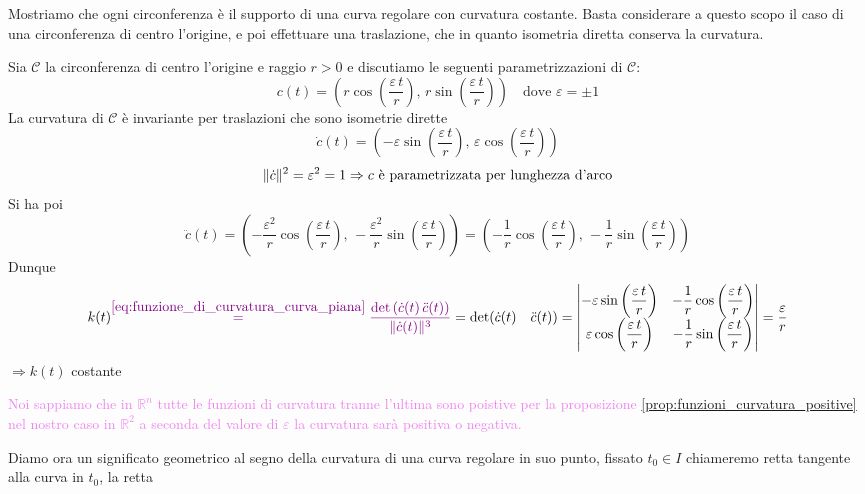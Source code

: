         \begin{esempio}
        Mostriamo che ogni circonferenza è il supporto di una curva regolare con curvatura costante.
        Basta considerare a questo scopo il caso di una circonferenza di centro l'origine, e poi effettuare una traslazione, che in quanto isometria diretta
        conserva la curvatura.

        Sia $\mathcal{C}$ la circonferenza di centro l'origine e raggio $r>0$ e discutiamo le seguenti parametrizzazioni di $\mathcal{C}$:
        \[ c(t) = \left(r \cos \left(\frac{\varepsilon \, t}{r}\right), \, r \sin \left(\frac{\varepsilon \, t}{r}\right) \right) \quad \text{dove }\varepsilon = \pm 1  \]
        La curvatura di $\mathcal{C}$ è invariante per traslazioni che sono isometrie dirette
        \[ \dot{c}(t) = \left(-\varepsilon \sin \left(\frac{\varepsilon \, t}{r}\right), \, \varepsilon \cos \left(\frac{\varepsilon \, t}{r}\right) \right) \]
        \[ \lVert\dot{c}\rVert^2 = \varepsilon^2 =1 \Rightarrow c \text{ è parametrizzata per lunghezza d'arco} \]
        Si ha poi
        \[ \ddot{c}(t) = \left(-\frac{\varepsilon^2}{r} \cos \left(\frac{\varepsilon \, t}{r}\right), \, -\frac{\varepsilon^2}{r} \sin \left(\frac{\varepsilon \, t}{r}\right) \right) = \left(-\frac{1}{r} \cos \left(\frac{\varepsilon \, t}{r}\right), \, -\frac{1}{r} \sin \left(\frac{\varepsilon \, t}{r}\right) \right) \]
        Dunque 
        \[ k(t) \textcolor{violet}{\overset{{\eqref{eq:funzione_di_curvatura_curva_piana}}}{=} \frac{\det \left( \dot{c}(t) \, \ddot{c}(t) \right)}{ \lVert\dot{c}(t)\rVert^3}} = \det(\dot{c}(t) \quad \ddot{c}(t)) = \begin{vmatrix}
            -\varepsilon \sin \left(\dfrac{\varepsilon \, t}{r}\right) & -\dfrac{1}{r} \cos \left(\dfrac{\varepsilon \, t}{r}\right) \\
            \varepsilon \cos \left(\dfrac{\varepsilon \, t}{r}\right) & -\dfrac{1}{r} \sin \left(\dfrac{\varepsilon \, t}{r}\right)
        \end{vmatrix} =  \dfrac{\varepsilon}{r} \]
        $\Rightarrow k(t)$ costante

        \textcolor{violet}{Noi sappiamo che in $\mathbb{R}^n$ tutte le funzioni di curvatura tranne l'ultima sono poistive per la proposizione \ref{prop:funzioni_curvatura_positive}
        nel nostro caso in $\mathbb{R}^2$ a seconda del valore di $\varepsilon$ la curvatura sarà positiva o negativa.}
        \end{esempio}
        \newpage
        Diamo ora un significato geometrico al segno della curvatura di una curva regolare in suo punto, fissato $t_0 \in I$ chiameremo retta tangente alla curva in $t_0$, la retta
